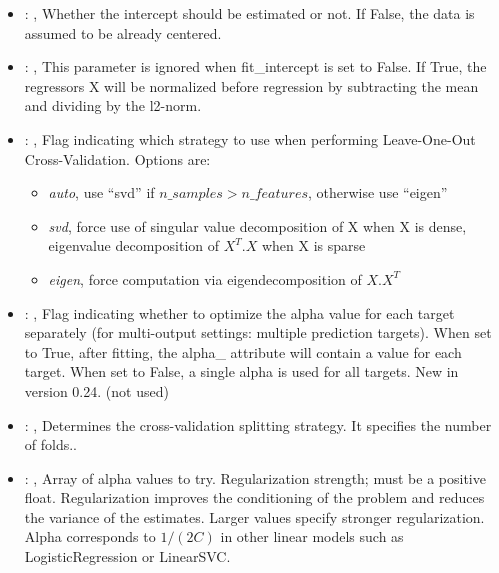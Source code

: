 \begin{itemize}
    \item {}: , 
      Whether the intercept should be estimated or not. If False,
      the data is assumed to be already centered.

    \item {}: , 
      This parameter is ignored when fit\_intercept is set to False. If True, the
      regressors X will be normalized before regression by subtracting the mean and dividing
      by the l2-norm.

    \item {}: , 
      Flag indicating which strategy to use when performing Leave-One-Out Cross-Validation.
      Options are:                                                  \begin{itemize}
      \item \textit{auto}, use ``svd'' if $n\_samples > n\_features$, otherwise use ``eigen''
      \item \textit{svd}, force use of singular value decomposition of X when X is
      dense, eigenvalue decomposition of $X^T.X$ when X is sparse
      \item \textit{eigen}, force computation via eigendecomposition of $X.X^T$
      \end{itemize}

    \item {}: , 
      Flag indicating whether to optimize the alpha value for each target separately
      (for multi-output settings: multiple prediction targets). When set to True, after fitting,
      the alpha\_ attribute will contain a value for each target. When set to False, a single alpha
      is used for all targets. New in version 0.24. (not used)

    \item {}: , 
      Determines the cross-validation splitting strategy.
      It specifies the number of folds..

    \item {}: , 
      Array of alpha values to try. Regularization strength; must be a positive float.
      Regularization                                                  improves the conditioning of
      the problem and reduces the variance of the estimates.
      Larger values specify stronger regularization. Alpha corresponds to $1 / (2C)$ in other
      linear models such as LogisticRegression or LinearSVC.


\end{itemize}
